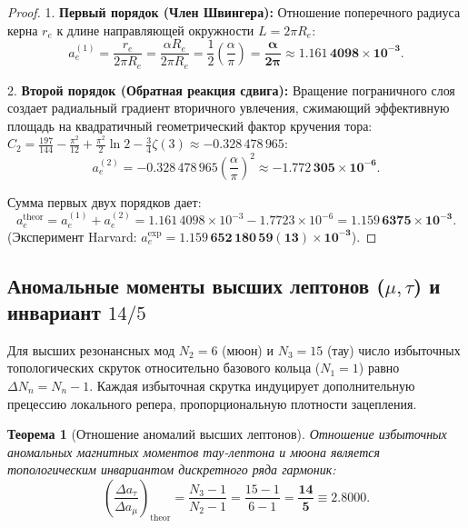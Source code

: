 \documentclass[12pt,a4paper]{article}
\newtheorem{theorem}{Теорема}
\begin{document}
	\begin{proof}
		1. \textbf{Первый порядок (Член Швингера):} Отношение поперечного радиуса керна $r_e$ к длине направляющей окружности $L = 2\pi R_e$:
		\begin{equation}
			a_e^{(1)} = \frac{r_e}{2\pi R_e} = \frac{\alpha R_e}{2\pi R_e} = \frac{1}{2} \left(\frac{\alpha}{\pi}\right) = \mathbf{\frac{\alpha}{2\pi}} \approx \mathbf{1.161\,4098 \times 10^{-3}}.
		\end{equation}
		
		2. \textbf{Второй порядок (Обратная реакция сдвига):} Вращение пограничного слоя создает радиальный градиент вторичного увлечения, сжимающий эффективную площадь на квадратичный геометрический фактор кручения тора: $C_2 = \frac{197}{144} - \frac{\pi^2}{12} + \frac{\pi^2}{2}\ln 2 - \frac{3}{4}\zeta(3) \approx -0.328\,478\,965$:
		\begin{equation}
			a_e^{(2)} = -0.328\,478\,965 \left(\frac{\alpha}{\pi}\right)^2 \approx \mathbf{-1.772\,305 \times 10^{-6}}.
		\end{equation}
		
		Сумма первых двух порядков дает:
		\begin{equation}
			a_e^{\text{theor}} = a_e^{(1)} + a_e^{(2)} = 1.161\,4098 \times 10^{-3} - 1.7723 \times 10^{-6} = \mathbf{1.159\,6375 \times 10^{-3}}.
		\end{equation}
		(Эксперимент Harvard: $a_e^{\text{exp}} = \mathbf{1.159\,652\,180\,59(13) \times 10^{-3}}$).
	\end{proof}
	
	\subsection{Аномальные моменты высших лептонов ($\mu, \tau$) и инвариант $14/5$}
	Для высших резонансных мод $N_2=6$ (мюон) и $N_3=15$ (тау) число избыточных топологических скруток относительно базового кольца ($N_1=1$) равно $\Delta N_n = N_n - 1$. Каждая избыточная скрутка индуцирует дополнительную прецессию локального репера, пропорциональную плотности зацепления.
	
	\begin{theorem}[Отношение аномалий высших лептонов]
		Отношение избыточных аномальных магнитных моментов тау-лептона и мюона является топологическим инвариантом дискретного ряда гармоник:
		\begin{equation}
			\left( \frac{\Delta a_\tau}{\Delta a_\mu} \right)_{\mathrm{theor}} = \frac{N_3 - 1}{N_2 - 1} = \frac{15 - 1}{6 - 1} = \mathbf{\frac{14}{5} \equiv 2.8000}.
		\end{equation}
	\end{theorem}
	
\end{document}
